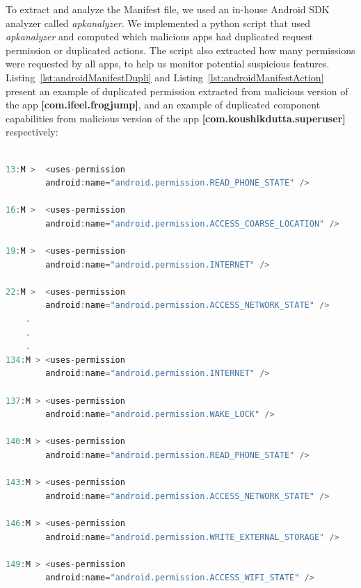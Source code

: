 To extract and analyze the Manifest file, we used an in-house Android SDK analyzer called \textit{apkanalyzer}. We implemented a python script that used \textit{apkanalyzer} and computed which malicious apps had duplicated request permission or duplicated actions. The script also extracted how many permissions were requested by all apps, to help us monitor potential suspicious features. Listing~\ref{lst:androidManifestDupli} and Listing~\ref{lst:androidManifestAction} present an example of duplicated permission extracted from malicious version of the app \textbf{[com.ifeel.frogjump]}, and an example of duplicated component capabilities from malicious version of the app \textbf{[com.koushikdutta.superuser]} respectively:


\begin{lstlisting}[caption={Example of duplicated permission from malicious version of app (com.ifeel.frogjump)}, language=Java,
    basicstyle=\fontsize{6}{5}\selectfont\ttfamily,
    label={lst:androidManifestDupli}]

13:M >  <uses-permission
        android:name="android.permission.READ_PHONE_STATE" />

16:M >  <uses-permission
        android:name="android.permission.ACCESS_COARSE_LOCATION" />

19:M >  <uses-permission
        android:name="android.permission.INTERNET" />

22:M >  <uses-permission
        android:name="android.permission.ACCESS_NETWORK_STATE" />
    .
    .
    .
134:M > <uses-permission
        android:name="android.permission.INTERNET" />

137:M > <uses-permission
        android:name="android.permission.WAKE_LOCK" />

140:M > <uses-permission
        android:name="android.permission.READ_PHONE_STATE" />

143:M > <uses-permission
        android:name="android.permission.ACCESS_NETWORK_STATE" />

146:M > <uses-permission
        android:name="android.permission.WRITE_EXTERNAL_STORAGE" />

149:M > <uses-permission
        android:name="android.permission.ACCESS_WIFI_STATE" />
\end{lstlisting}

